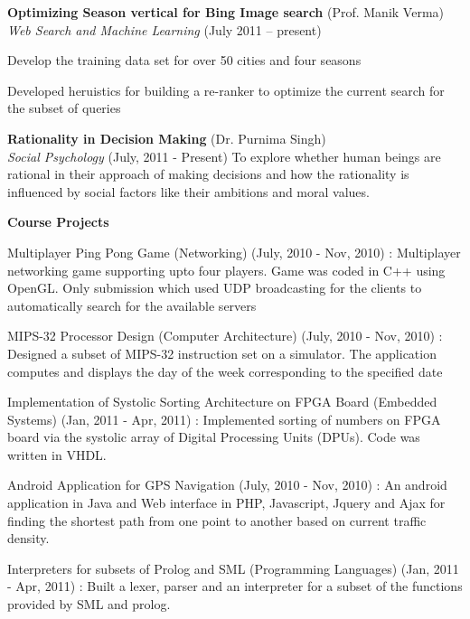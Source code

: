 \documentclass[margin,line]{resume}
\begin{document}
\begin{resume}
    \textbf{Optimizing Season vertical for Bing Image search}   \hfill(Prof. Manik Verma)\vspace{1mm}\\\vspace{1mm}%
    \textsl{Web Search and Machine Learning}                    \hfill(July 2011 -- present)
    \begin{list2}
        \item Develop the training data set for over 50 cities and four seasons
        \item Developed heruistics for building a re-ranker to optimize the current search for the subset of queries
    \end{list2}
        
    \textbf{Rationality in Decision Making}                     \hfill(Dr. Purnima Singh)\vspace{1mm}\\\vspace{1mm}%
    \textsl{Social Psychology}                                  \hfill(July, 2011 - Present)
    To explore whether human beings are rational in their approach of making decisions and how the rationality is       influenced by social factors like their ambitions and moral values.
    
    \textbf{Course Projects}
    \begin{list2}
        \item Multiplayer Ping Pong Game (Networking) (July, 2010 - Nov, 2010) : Multiplayer networking game supporting
upto four players. Game was coded in C++ using OpenGL. Only submission which used UDP broadcasting for the
clients to automatically search for the available servers
         \item MIPS-32 Processor Design (Computer Architecture) (July, 2010 - Nov, 2010) : Designed a subset of MIPS-32
instruction set on a simulator. The application computes and displays the day of the week corresponding to the
specified date
        \item Implementation of Systolic Sorting Architecture on FPGA Board (Embedded Systems) (Jan, 2011 - Apr,
2011) : Implemented sorting of numbers on FPGA board via the systolic array of Digital Processing Units (DPUs).
Code was written in VHDL.
        \item Android Application for GPS Navigation (July, 2010 - Nov, 2010) : An android application in Java and Web
interface in PHP, Javascript, Jquery and Ajax for finding the shortest path from one point to another based on
current traffic density.
        \item Interpreters for subsets of Prolog and SML (Programming Languages) (Jan, 2011 - Apr, 2011) : Built a
lexer, parser and an interpreter for a subset of the functions provided by SML and prolog.
    \end{list2}
    

\end{resume}
\end{document}
